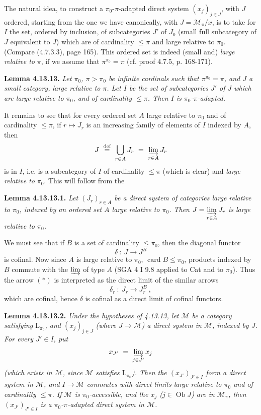 \documentclass[11pt]{article}
\newcommand{\printedpage}[1]{\marginpar{\footnotesize p.~#1}}
\newcommand{\msp}[1]{\marginpar{\footnotesize [#1]}}
\newcommand{\ilim}{\varinjlim\limits}
\newcommand{\Ob}{\operatorname{Ob}}
\begin{document}
The natural idea, to construct a $\pi_0$-$\pi$-adapted direct system $(x_j)_{j\in J}$, with $J$ ordered, starting from the one we have canonically, with $J = \mathcal{M}_\pi/x$, is to take for $I$ the set, ordered by inclusion, of subcategories $J'$ of $J_0$ (small full subcategory of $J$ equivalent to $J$) which are of cardinality $\leqslant \pi$ and large relative to $\pi_0$. (Compare (4.7.3.3), page 165). This ordered set is indeed (small and) \textit{large relative to} $\pi$, if we assume that $\pi^{\pi_0} = \pi$ (cf. proof 4.7.5, p. 168-171).

\msp{page 305}\noindent\textbf{Lemma 4.13.13.} \textit{Let $\pi_0$, $\pi > \pi_0$ be infinite cardinals such that $\pi^{\pi_0} = \pi$, and $J$ a small category, large relative to $\pi$. Let $I$ be the set of subcategories $J'$ of $J$ which are large relative to $\pi_0$, and of cardinality $\leqslant \pi$. Then $I$ is $\pi_0$-$\pi$-adapted.}

It remains to see that for every ordered set $A$ large relative to $\pi_0$ and of cardinality $\leqslant \pi$, if $r \longmapsto J_r$ is an increasing family of elements of $I$ indexed by $A$, then
\[
J \ \overset{\text{def}}{=} \ \bigcup_{r\in A} J_r \ = \ \varinjlim_{r\in A} J_r
\]
is in $I$, i.e. is a subcategory of $I$ of cardinality $\leqslant \pi$ (which is clear) and \textit{large relative to} $\pi_0$. This will follow from the

\printedpage{115}

\noindent\textbf{Lemma 4.13.13.1.} \textit{Let $(J_r)_{r\in A}$ be a direct system of categories large relative to $\pi_0$, indexed by an ordered set $A$ large relative to $\pi_0$. Then $J = \ilim_{r\in A} J_r$ is large relative to $\pi_0$.}

\msp{page 306}\noindent We must see that if $B$ is a set of cardinality $\leqslant \pi_0$, then the diagonal functor
\[
\delta \ : \ J \longrightarrow J^B \tag*{$(*)$}
\]
is cofinal. Now since $A$ is large relative to $\pi_0$, $\operatorname{card} B \leqslant \pi_0$, products indexed by $B$ commute with the $\varinjlim$ of type $A$ (SGA 4 I 9.8 applied to Cat and to $\pi_0$). Thus the arrow $(*)$ is interpreted as the direct limit of the similar arrows
\[
\delta_r \ : \ J_r \longrightarrow J_r^B \ , \tag*{$(**)$}
\]
which are cofinal, hence $\delta$ is cofinal as a direct limit of cofinal functors.

\noindent\textbf{Lemma 4.13.13.2.} \textit{Under the hypotheses of 4.13.13, let $\mathcal{M}$ be a category satisfying $\mathrm{L}_{\pi_0}$, and $(x_j)_{j\in J}$ (where $J \longrightarrow \mathcal{M}$) a direct system in $\mathcal{M}$, indexed by $J$. For every $J' \in I$, put}
\[
x_{J'} \ = \ \varinjlim_{j\in J'} x_j
\]
\msp{page 307}\textit{(which exists in $\mathcal{M}$, since $\mathcal{M}$ satisfies $\mathrm{L}_{\pi_0}$). Then the $(x_{J'})_{J'\in I}$ form a direct system in $\mathcal{M}$, and $I \longrightarrow \mathcal{M}$ commutes with direct limits large relative to $\pi_0$ and of cardinality $\leqslant \pi$. If $\mathcal{M}$ is $\pi_0$-accessible, and the $x_j$ ($j \in \Ob J$) are in $\mathcal{M}_\pi$, then $(x_{J'})_{J'\in I}$ is a $\pi_0$-$\pi$-adapted direct system in $\mathcal{M}$.}
\end{document}
